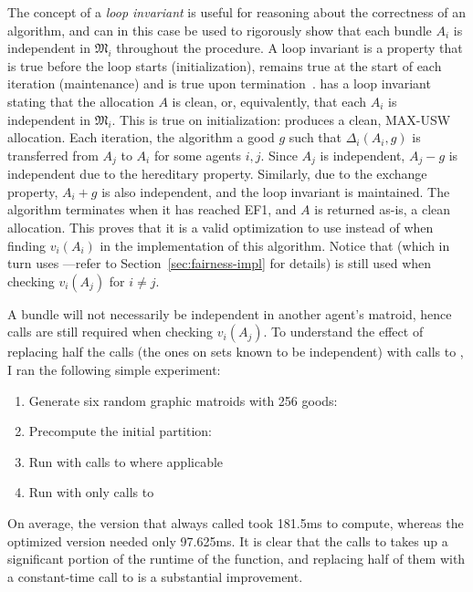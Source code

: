 The concept of a \textit{loop invariant} is useful for reasoning about the correctness of an algorithm, and can in this case be used to rigorously show that each bundle $A_i$ is independent in $\mathfrak{M}_i$ throughout the procedure. A loop invariant is a property that is true before the loop starts (initialization), remains true at the start of each iteration (maintenance) and is true upon termination~\cite{Cormen2009-zm}.  has a loop invariant stating that the allocation $A$ is clean, or, equivalently, that each $A_i$ is independent in $\mathfrak{M}_i$. This is true on initialization:  produces a clean, MAX-USW allocation. Each iteration, the algorithm a good $g$ such that $\Delta_i(A_i, g)$ is transferred from $A_j$ to $A_i$ for some agents $i,j$. Since $A_j$ is independent, $A_j-g$ is independent due to the hereditary property. Similarly, due to the exchange property, $A_i+g$ is also independent, and the loop invariant is maintained. The algorithm terminates when it has reached EF1, and $A$ is returned as-is, a clean allocation. This proves that it is a valid optimization to use  instead of  when finding $v_i(A_i)$ in the implementation of this algorithm. Notice that  (which in turn uses ---refer to Section~\ref{sec:fairness-impl} for details) is still used when checking $v_i(A_j)$ for $i\neq j$. 

A bundle will not necessarily be independent in another agent's matroid, hence  calls are still required when checking $v_i(A_j)$. To understand the effect of replacing half the  calls (the ones on sets known to be independent) with calls to , I ran the following simple experiment:
\begin{enumerate}
  \item Generate six random graphic matroids with 256 goods: \\
  \item Precompute the initial partition: \\
  \item Run  with calls to  where applicable
  \item Run  with only calls to 
\end{enumerate}
On average, the version that always called  took 181.5ms to compute, whereas the optimized version needed only 97.625ms. It is clear that the calls to  takes up a significant portion of the runtime of the function, and replacing half of them with a constant-time call to  is a substantial improvement.

